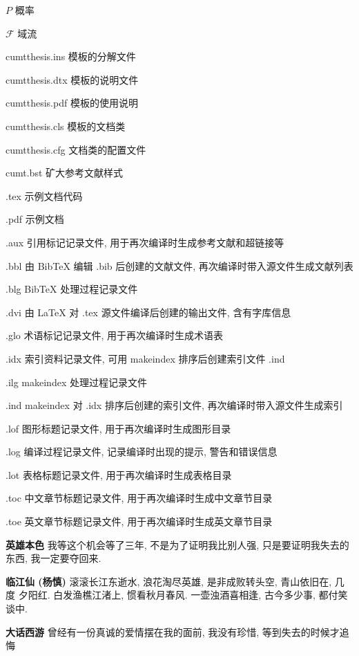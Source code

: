 \documentclass[preprint,authoryear,PhD]{cumtthesis}
\begin{document}
\listoffigures
\listoftables

\begin{notation}[2.5cm]
\item[$P$] 概率
\item[$\mathcal{F}$] 域流
\item[cumtthesis.ins] 模板的分解文件
\item[cumtthesis.dtx] 模板的说明文件
\item[cumtthesis.pdf] 模板的使用说明
\item[cumtthesis.cls] 模板的文档类
\item[cumtthesis.cfg] 文档类的配置文件
\item[cumt.bst] 矿大参考文献样式
\item[.tex] 示例文档代码
\item[.pdf] 示例文档
\item[.aux] 引用标记记录文件, 用于再次编译时生成参考文献和超链接等
\item[.bbl] 由 BibTeX 编辑 .bib 后创建的文献文件, 再次编译时带入源文件生成文献列表
\item[.blg] BibTeX 处理过程记录文件
\item[.dvi] 由 \LaTeX{} 对 .tex 源文件编译后创建的输出文件, 含有字库信息
\item[.glo] 术语标记记录文件, 用于再次编译时生成术语表
\item[.idx] 索引资料记录文件, 可用 makeindex 排序后创建索引文件 .ind
\item[.ilg] makeindex 处理过程记录文件
\item[.ind] makeindex 对 .idx 排序后创建的索引文件, 再次编译时带入源文件生成索引
\item[.lof] 图形标题记录文件, 用于再次编译时生成图形目录
\item[.log] 编译过程记录文件, 记录编译时出现的提示, 警告和错误信息
\item[.lot] 表格标题记录文件, 用于再次编译时生成表格目录
\item[.toc] 中文章节标题记录文件, 用于再次编译时生成中文章节目录
\item[.toe] 英文章节标题记录文件, 用于再次编译时生成英文章节目录
\item[\bf 英雄本色] 我等这个机会等了三年, 不是为了证明我比别人强, 只是要证明我失去的
    东西, 我一定要夺回来.
\item[\bf 临江仙 (杨慎)]滚滚长江东逝水, 浪花淘尽英雄, 是非成败转头空, 青山依旧在, 几度
    夕阳红. 白发渔樵江渚上, 惯看秋月春风. 一壶浊酒喜相逢, 古今多少事, 都付笑谈中.
\item[\bf 大话西游] 曾经有一份真诚的爱情摆在我的面前, 我没有珍惜, 等到失去的时候才追悔

\end{notation}
\end{document}
